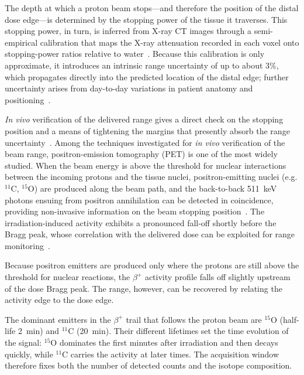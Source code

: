 \documentclass[11pt]{article}
\begin{document}
The depth at which a proton beam stops---and therefore the position of the
distal dose edge---is determined by the stopping power of the tissue it
traverses. This stopping power, in turn,  is 
inferred from X-ray CT images through a semi-empirical calibration that maps the X-ray attenuation recorded
in each voxel onto stopping-power ratios relative to water~\cite{Paganetti2012}. 
Because this calibration is only approximate, it
introduces an intrinsic range uncertainty of up to about $3\%$, which
propagates directly into the predicted location of the distal edge; further
uncertainty arises from day-to-day variations in patient anatomy and
positioning~\cite{Paganetti2012}.  


\emph{In vivo} verification of the delivered range gives a direct check on the
stopping position and a means of tightening the margins that presently absorb
the range uncertainty~\cite{Paganetti2012}. Among the techniques investigated for \emph{in vivo} verification of the beam range,
positron-emission tomography (PET) is one of the most widely studied. When the
beam energy is above the threshold for nuclear interactions between the
incoming protons and the tissue nuclei, positron-emitting nuclei (e.g.
$^{11}$C, $^{15}$O) are produced along the beam path, and the back-to-back
\SI{511}{\kilo\electronvolt} photons ensuing from positron annihilation can be detected
in coincidence, providing non-invasive information on the beam stopping
position~\cite{Bennett1978,Enghardt2004}. The irradiation-induced activity
exhibits a pronounced fall-off shortly before the Bragg peak, whose
correlation with the delivered dose can be exploited for range
monitoring~\cite{Parodi2018}. 


Because positron emitters are produced only where the protons are still above
the threshold for nuclear reactions, the $\beta^{+}$ activity profile falls off
slightly upstream of the dose Bragg peak.
The range, however, can be recovered by relating the
activity edge to the dose edge.


The dominant emitters in the $\beta^{+}$ trail that follows the proton beam are
$^{15}$O (half-life \SI{2}{\minute}) and $^{11}$C (\SI{20}{\minute}). Their different lifetimes
set the time evolution of the signal: $^{15}$O
dominates the first minutes after irradiation and then decays quickly, while
$^{11}$C carries the activity at later times. The acquisition window therefore
fixes both the number of detected counts and the isotope composition.
\end{document}
